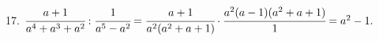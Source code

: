 17. $\cfrac{a+1}{a^4+a^3+a^2}: \cfrac{1}{a^5-a^2}=\cfrac{a+1}{a^2(a^2+a+1)}\cdot\cfrac{a^2(a-1)(a^2+a+1)}{1}=a^2-1.$\\
